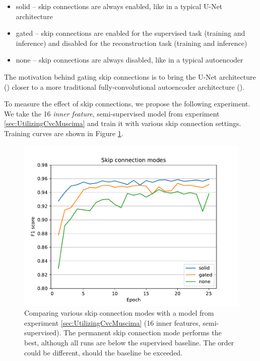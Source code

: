 \begin{itemize}
    \item solid -- skip connections are always enabled, like in a typical U-Net architecture
    \item gated -- skip connections are enabled for the supervised task (training and inference) and disabled for the reconstruction task (training and inference)
    \item none -- skip connections are always disabled, like in a typical autoencoder
\end{itemize}

The motivation behind gating skip connections is to bring the U-Net architecture (\cite{UNet}) closer to a more traditional fully-convolutional autoencoder architecture (\cite{AutoencodersOverview}).

To measure the effect of skip connections, we propose the following experiment. We take the 16 \emph{inner feature}, semi-supervised model from experiment \ref{sec:UtilizingCvcMuscima} and train it with various skip connection settings. Training curves are shown in Figure \ref{fig:SkipConnections}.

\begin{figure}[ht]
    \centering
    \includegraphics[width=140mm]{../../figures/05-skip-connections/skip.pdf}
    \caption{Comparing various skip connection modes with a model from experiment \ref{sec:UtilizingCvcMuscima} (16 inner features, semi-supervised). The permanent skip connection mode performs the best, although all runs are below the supervised baseline. The order could be different, should the baseline be exceeded.}
    \label{fig:SkipConnections}
\end{figure}

